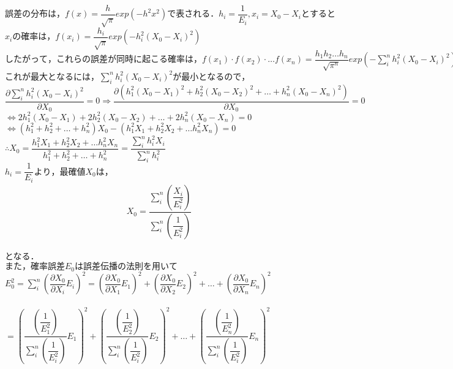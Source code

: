 \documentclass[a4paper,1pt]{jsarticle}
\begin{document}
  $誤差の分布は，f(x)=\dfrac{h}{\sqrt{\pi}}exp(-h^2x^2)で表される．h_i=\dfrac{1}{E_i},x_i=X_0-X_iとすると$\\

  $x_iの確率は，f(x_i)=\dfrac{h_i}{\sqrt{\pi}}exp(-h_i^2(X_0-X_i)^2)$\\

  $したがって，これらの誤差が同時に起こる確率は，f(x_1)\cdot f(x_2)\cdot \dots f(x_n)=\dfrac{h_1h_2\dots h_n}{\sqrt{\pi^n}}exp(-\sum_{i}^{n}   h_i^2(X_0-X_i)^2).$\\

  $これが最大となるには，\sum_{i}^{n} h_i^2(X_0-X_i)^2が最小となるので， $\\

  $\dfrac{\partial \sum_{i}^{n} h_i^2(X_0-X_i)^2}{\partial X_0}=0\Longrightarrow \dfrac{\partial (h_1^2(X_0-X_1)^2+h_2^2(X_0-X_2)^2+\dots +h_n^2(X_0-X_n)^2)}{\partial X_0}=0$\\

  $\Longleftrightarrow 2h_1^2(X_0-X_1)+2h_2^2(X_0-X_2)+\dots +2h_n^2(X_0-X_n)=0$\\

  $\Longleftrightarrow  (h_1^2+h_2^2+\dots +h_n^2)X_0-(h_1^2X_1+h_2^2X_2+\dots h_n^2X_n)=0 $\\

  $\therefore X_0=\dfrac{h_1^2X_1+h_2^2X_2+\dots h_n^2X_n}{h_1^2+h_2^2+\dots +h_n^2}=\dfrac{\sum_{i}^{n} h_i^2X_i }{\sum_{i}^{n} h_i^2}$\\

  $h_i=\dfrac{1}{E_i}より，最確値X_0は，$\\

  \begin{eqnarray}
    \label{katiheikin}
    X_0=\dfrac{\sum_{i}^{n} \left(\dfrac{X_i}{E_i^2}\right) }{\sum_{i}^{n} \left(\dfrac{1}{E_i^2}\right)}
  \end{eqnarray}

  となる．\\

  $また，確率誤差E_0は誤差伝播の法則を用いて$\\

  $E_0^2=\sum_{i}^{n}\left(\dfrac{\partial X_0}{\partial X_i}E_i\right)^2=\left(\dfrac{\partial X_0}{\partial X_1}E_1\right)^2+\left(\dfrac{\partial X_0}{\partial X_2}E_2\right)^2+\dots +\left(\dfrac{\partial X_0}{\partial X_n}E_n\right)^2  $\\\\

  $=\left(\dfrac{\left(\dfrac{1}{E_1^2}\right) }{\sum_{i}^{n} \left(\dfrac{1}{E_i^2}\right)}E_1\right)^2+\left(\dfrac{\left(\dfrac{1}{E_2^2}\right) }{\sum_{i}^{n} \left(\dfrac{1}{E_i^2}\right)}E_2\right)^2+\dots +\left(\dfrac{\left(\dfrac{1}{E_n^2}\right) }{\sum_{i}^{n} \left(\dfrac{1}{E_i^2}\right)}E_n\right)^2$\\\\
\end{document}
